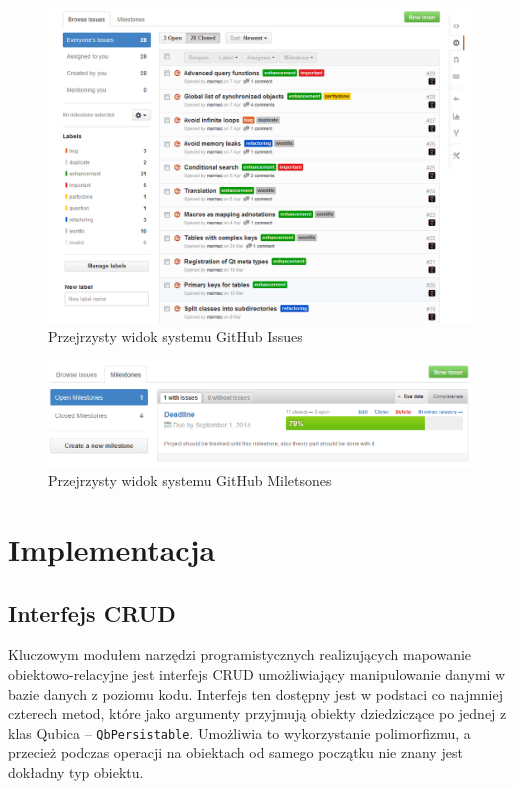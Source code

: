 \documentclass[12pt]{report}
\begin{document}
\begin{figure}[h]
\centering
\includegraphics[width=\textwidth]{resources/githubissue.png}
\caption{Przejrzysty widok systemu GitHub Issues}
\end{figure}

\begin{figure}[h!]
\centering
\includegraphics[width=\textwidth]{resources/githubmilestone.png}
\caption{Przejrzysty widok systemu GitHub Miletsones}
\end{figure}

\section{Implementacja}

\subsection{Interfejs CRUD}

Kluczowym modułem narzędzi programistycznych realizujących mapowanie obiekt\-owo-relacyjne jest interfejs CRUD umożliwiający manipulowanie danymi w bazie danych z 
poziomu kodu. Interfejs ten dostępny jest w podstaci co najmniej czterech metod, które jako argumenty przyjmują obiekty dziedziczące po jednej z klas Qubica -- 
{\tt QbPersistable}. Umożliwia to wykorzystanie polimorfizmu, a przecież podczas operacji na obiektach od samego początku nie znany jest dokładny typ obiektu.
\end{document}
